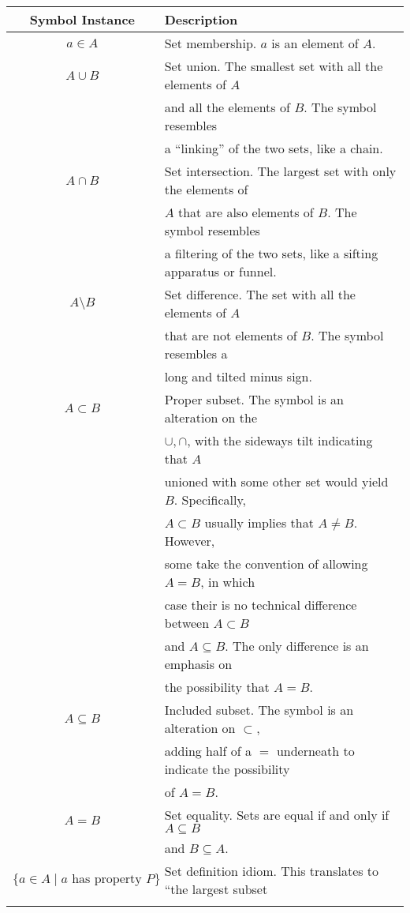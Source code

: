 \documentclass{article}
\begin{document}
	\begin{tabular}{c|l}
		Symbol Instance & Description \\ \hline
		$a \in A$ &
			Set membership. $a$ is an element of $A$.
		\\\hline
		$A \cup B$ &
			Set union. The smallest set with all the elements of $A$ \\&
			and all the elements of $B$. The symbol resembles \\&
			a ``linking'' of the two sets, like a chain.
		\\\hline
		$A \cap B$ &
			Set intersection. The largest set with only the elements of \\&
			$A$ that are also elements of $B$. The symbol resembles \\&
			a filtering of the two sets, like a sifting apparatus or funnel.
		\\\hline
		$A \setminus B$ &
			Set difference. The set with all the elements of $A$ \\&
			that are not elements of $B$. The symbol resembles a \\&
			long and tilted minus sign.
		\\\hline
		$A \subset B$ &
			Proper subset. The symbol is an alteration on the \\&
			$\cup, \cap$, with the sideways tilt indicating that $A$ \\&
			unioned with some other set would yield $B$. Specifically, \\&
			$A \subset B$ usually implies that $A \neq B$. However, \\&
			some take the convention of allowing $A = B$, in which \\&
			case their is no technical difference between $A \subset B$ \\&
			and $A \subseteq B$. The only difference is an emphasis on \\&
			the possibility that $A = B$.
		\\\hline
		$A \subseteq B$ &
			Included subset. The symbol is an alteration on $\subset$,\\&
			adding half of a $=$ underneath to indicate the possibility \\&
			of $A = B$.
		\\\hline
		$A = B$ &
			Set equality. Sets are equal if and only if $A \subseteq B$\\&
			 and $B \subseteq A.$
		\\\hline
		$\{ a \in A \mid a \text{ has property } P \}$ &
			Set definition idiom. This translates to ``the largest subset \\&

\end{tabular}
\end{document}
